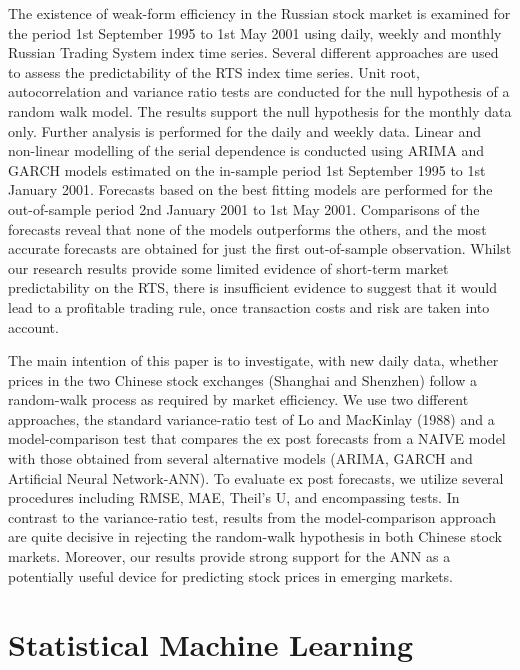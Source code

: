 The existence of weak-form efficiency in the Russian stock market is examined for the period 1st September 1995 to 1st May 2001 using daily, weekly and monthly Russian Trading System index time series.\cite{Abrosimova:2002aa} Several different approaches are used to assess the predictability of the RTS index time series. Unit root, autocorrelation and variance ratio tests are conducted for the null hypothesis of a random walk model. The results support the null hypothesis for the monthly data only. Further analysis is performed for the daily and weekly data. Linear and non-linear modelling of the serial dependence is conducted using ARIMA and GARCH models estimated on the in-sample period 1st September 1995 to 1st January 2001. Forecasts based on the best fitting models are performed for the out-of-sample period 2nd January 2001 to 1st May 2001. Comparisons of the forecasts reveal that none of the models outperforms the others, and the most accurate forecasts are obtained for just the first out-of-sample observation. Whilst our research results provide some limited evidence of short-term market predictability on the RTS, there is insufficient evidence to suggest that it would lead to a profitable trading rule, once transaction costs and risk are taken into account.

The main intention of this paper is to investigate, with new daily data, whether prices in the two Chinese stock exchanges (Shanghai and Shenzhen) follow a random-walk process as required by market efficiency.\cite{Darrat:2001aa} We use two different approaches, the standard variance-ratio test of Lo and MacKinlay (1988) and a model-comparison test that compares the ex post forecasts from a NAIVE model with those obtained from several alternative models (ARIMA, GARCH and Artificial Neural Network-ANN). To evaluate ex post forecasts, we utilize several procedures including RMSE, MAE, Theil's U, and encompassing tests. In contrast to the variance-ratio test, results from the model-comparison approach are quite decisive in rejecting the random-walk hypothesis in both Chinese stock markets. Moreover, our results provide strong support for the ANN as a potentially useful device for predicting stock prices in emerging markets.

\section{Statistical Machine Learning}

